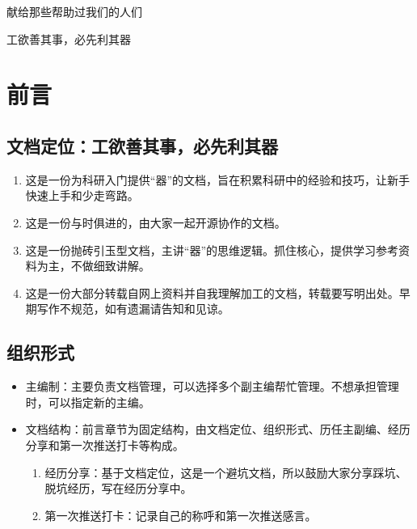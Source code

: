 \documentclass[cn,11pt,chinese,twoside]{elegantbook}
\begin{document}
\maketitle
\frontmatter


\newpage
\thispagestyle{empty}
\noindent\begin{center}
{\fontsize{20pt}{0}\kaishu 献给那些帮助过我们的人们}
\end{center} 

\newpage
\thispagestyle{empty}
\noindent\begin{center}
{\fontsize{20pt}{0}\kaishu 工欲善其事，必先利其器} %
\end{center} 


\tableofcontents
\label{content}
\mainmatter


\chapter*{前言}
\section*{文档定位：工欲善其事，必先利其器}
\begin{enumerate}
\item 这是一份为科研入门提供“器”的文档，旨在积累科研中的经验和技巧，让新手快速上手和少走弯路。
\item 这是一份与时俱进的，由大家一起开源协作的文档。
\item 这是一份抛砖引玉型文档，主讲“器”的思维逻辑。抓住核心，提供学习参考资料为主，不做细致讲解。
\item 这是一份大部分转载自网上资料并自我理解加工的文档，转载要写明出处。早期写作不规范，如有遗漏请告知和见谅。
\end{enumerate}



\section*{组织形式}
\begin{itemize}
\item 主编制：主要负责文档管理，可以选择多个副主编帮忙管理。不想承担管理时，可以指定新的主编。
\item 文档结构：前言章节为固定结构，由文档定位、组织形式、历任主副编、经历分享和第一次推送打卡等构成。
\begin{enumerate}
\item 经历分享：基于文档定位，这是一个避坑文档，所以鼓励大家分享踩坑、脱坑经历，写在经历分享中。
\item 第一次推送打卡：记录自己的称呼和第一次推送感言。
\end{enumerate}
\end{itemize}
\end{document}
